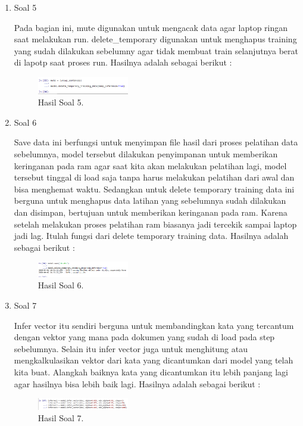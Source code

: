 \begin{enumerate}
	\item Soal 5
	\hfill\break
	
	Pada bagian ini, mute digunakan untuk mengacak data agar laptop ringan saat melakukan run. delete\_temporary digunakan untuk menghapus training yang sudah dilakukan sebelumny agar tidak membuat train selanjutnya berat di lapotp saat proses run. Hasilnya adalah sebagai berikut :
	\begin{figure}[H]

	\centering
		\includegraphics[width=4cm]{figures/1174095/tugas5/h24.PNG}
		\caption{Hasil Soal 5.}
	\end{figure}

	\item Soal 6
	\hfill\break
	
	Save data ini berfungsi untuk menyimpan file hasil dari proses pelatihan data sebelumnya, model tersebut dilakukan penyimpanan untuk memberikan keringanan pada ram agar saat kita akan melakukan pelatihan lagi, model tersebut tinggal di load saja tanpa harus melakukan pelatihan dari awal dan bisa menghemat waktu. Sedangkan untuk delete temporary training data ini berguna untuk menghapus data latihan yang sebelumnya sudah dilakukan dan disimpan, bertujuan untuk memberikan keringanan pada ram. Karena setelah melakukan proses pelatihan ram biasanya jadi tercekik sampai laptop jadi lag. Itulah fungsi dari delete temporary training data. Hasilnya adalah sebagai berikut :
	\begin{figure}[H]
	\centering
		\includegraphics[width=4cm]{figures/1174095/tugas5/h25.PNG}
		\caption{Hasil Soal 6.}
	\end{figure}

	\item Soal 7
	\hfill\break
	
	Infer vector itu sendiri berguna untuk membandingkan kata yang tercantum dengan vektor yang mana pada dokumen yang sudah di load pada step sebelumnya. Selain itu infer vector juga untuk menghitung atau mengkalkulasikan vektor dari kata yang dicantumkan dari model yang telah kita buat. Alangkah baiknya kata yang dicantumkan itu lebih panjang lagi agar hasilnya bisa lebih baik lagi. Hasilnya adalah sebagai berikut :
	\begin{figure}[H]
	\centering
		\includegraphics[width=4cm]{figures/1174095/tugas5/h26.PNG}
		\caption{Hasil Soal 7.}
	\end{figure}


\end{enumerate}
